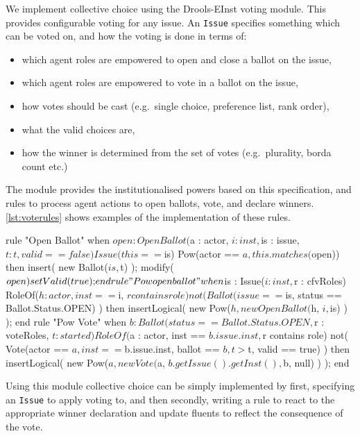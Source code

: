 
We implement collective choice using the Drools-EInst voting module. This
provides configurable voting for any issue. An \texttt{Issue} specifies
something which can be voted on, and how the voting is done in terms of:

\begin{itemize}
\item which agent roles are empowered to open and close a ballot on the issue,
\item which agent roles are empowered to vote in a ballot on the issue,
\item how votes should be cast (e.g.\ single choice, preference list, rank order),
\item what the valid choices are,
\item how the winner is determined from the set of votes (e.g.\ plurality, borda count etc.)
\end{itemize}

The module provides the institutionalised powers based on this specification,
and rules to process agent actions to open ballots, vote, and declare winners.
\autoref{lst:voterules} shows examples of the implementation of these rules.

\begin{drools}[label=lst:voterules,caption={Opening of ballots and voting.}]
rule "Open Ballot"
	when
		$open : OpenBallot($a : actor, $i : inst, $is : issue, $t: t, valid == false)
		Issue(this == $is)
		Pow(actor == $a, this.matches($open))
	then
		insert( new Ballot($is, $t) );
		modify($open) {
			setValid(true);
		}
end
rule "Pow open ballot"
	when
		$is : Issue($i : inst, $r : cfvRoles)
		RoleOf($h : actor, inst == $i, $r contains role)
		not( Ballot(issue == $is, status == Ballot.Status.OPEN) )
	then
		insertLogical( new Pow($h, new OpenBallot($h, $i, $is) ) );
end
rule "Pow Vote"
	when
		$b : Ballot(status == Ballot.Status.OPEN, $r : voteRoles, $t : started)
		RoleOf($a : actor, inst == $b.issue.inst, $r contains role)
		not( Vote(actor == $a, inst == $b.issue.inst, ballot == $b, t > $t, valid == true) )
	then
		insertLogical( new Pow($a, new Vote($a, $b.getIssue().getInst(), $b, null) ) );
end
\end{drools}

Using this module collective choice can be simply implemented by first,
specifying an \texttt{Issue} to apply voting to, and then secondly, writing a
rule to react to the appropriate winner declaration and update fluents to
reflect the consequence of the vote.

